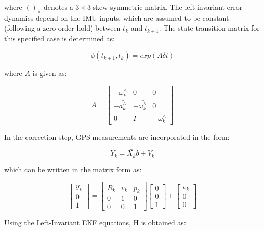 where $()_{\times}$ denotes a $3 \times 3$ skew-symmetric matrix. 
The left-invariant error dynamics depend on the IMU inputs, which are assumed to be constant (following a zero-order hold) between $t_{k}$ and $t_{k+1}$. The state transition matrix for this specified case is determined as:

\begin{equation}
    \phi(t_{k+1},t_{k}) = exp(A \delta t)
\end{equation}

where $A$ is given as:

\begin{equation}
    A = 
    \begin{bmatrix}
    -\bar{\omega_{k}^{\wedge}} & 0 & 0  \\
    -\bar{a_{k}^{\wedge}} & -\bar{\omega_{k}^{\wedge}} & 0 \\
    0 & I & -\bar{\omega_{k}^{\wedge}}
    \end{bmatrix}
\end{equation}

In the correction step, GPS measurements are incorporated in the form:

\begin{equation}
    Y_{k}=\bar{X_{k}}b+V_{k}
\end{equation}

which can be written in the matrix form as:

\begin{equation}
    \begin{bmatrix}
    y_{k} \\
    0 \\
    1
    \end{bmatrix}
    =
    \begin{bmatrix}
    \bar{R_{k}} & \bar{v_{k}} & \bar{p_{k}} \\
    0 & 1 & 0 \\
    0 & 0 & 1
    \end{bmatrix}
    \begin{bmatrix}
    0\\
    0\\
    1
    \end{bmatrix}
    +
    \begin{bmatrix}
    v_{k}\\
    0\\
    0
    \end{bmatrix}
\end{equation}

Using the Left-Invariant EKF equations, H is obtained as:

